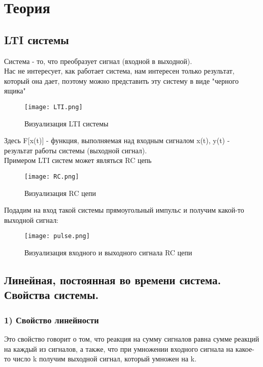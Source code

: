 \chapter{Теория}
\label{ch:intro}

\section*{\textbf{LTI системы}}

Система - то, что преобразует сигнал (входной в выходной). \\

Нас не интересует, как работает система, нам интересен только результат, который она дает, поэтому можно представить эту систему
в виде "черного ящика"

\begin{figure}[H]
    \centering
    \texttt{[image: LTI.png]}
    \caption{Визуализация LTI системы}
\end{figure}

Здесь F[x(t)] - функция, выполняемая над входным сигналом x(t), y(t) - результат работы системы (выходной сигнал). \\ 

Примером LTI систем может являться RC цепь

\begin{figure}[H]
    \centering
    \texttt{[image: RC.png]}
    \caption{Визуализация RC цепи}
\end{figure}

Подадим на вход такой системы прямоугольный импульс и получим какой-то выходной сигнал:

\begin{figure}[H]
    \centering
    \texttt{[image: pulse.png]}
    \caption{Визуализация входного и выходного сигнала RC цепи}
\end{figure}

\section*{Линейная, постоянная во времени система. Свойства системы.}

\subsection*{1) Свойство линейности}

Это свойство говорит о том, что реакция на сумму сигналов равна сумме реакций на каждый из сигналов, а также, что при умножении
входного сигнала на какое-то число k получим выходной сигнал, который умножен на k.

